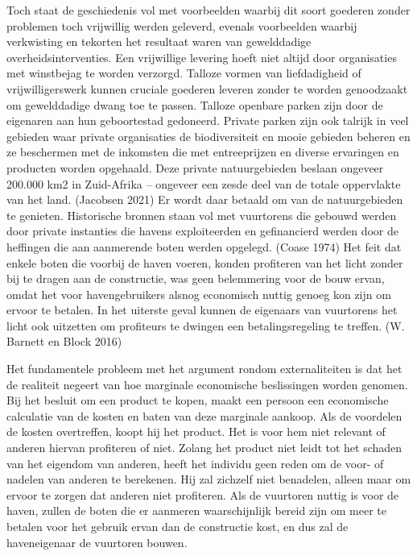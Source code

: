 \documentclass[
  a5paper,
  smalldemyvopaper,11pt,twoside,onecolumn,openright,extrafontsizes,
hidelinks]{memoir}
\begin{document}
Toch staat de geschiedenis vol met voorbeelden waarbij dit soort
goederen zonder problemen toch vrijwillig werden geleverd, evenals
voorbeelden waarbij verkwisting en tekorten het resultaat waren van
gewelddadige overheidsinterventies. Een vrijwillige levering hoeft niet
altijd door organisaties met winstbejag te worden verzorgd. Talloze
vormen van liefdadigheid of vrijwilligerswerk kunnen cruciale goederen
leveren zonder te worden genoodzaakt om gewelddadige dwang toe te
passen. Talloze openbare parken zijn door de eigenaren aan hun
geboortestad gedoneerd. Private parken zijn ook talrijk in veel gebieden
waar private organisaties de biodiversiteit en mooie gebieden beheren en
ze beschermen met de inkomsten die met entreeprijzen en diverse
ervaringen en producten worden opgehaald. Deze private natuurgebieden
beslaan ongeveer 200.000 km2 in Zuid-Afrika -- ongeveer een zesde deel
van de totale oppervlakte van het land. (Jacobsen 2021) Er wordt daar
betaald om van de natuurgebieden te genieten. Historische bronnen staan
vol met vuurtorens die gebouwd werden door private instanties die havens
exploiteerden en gefinancierd werden door de heffingen die aan
aanmerende boten werden opgelegd. (Coase 1974) Het feit dat enkele boten
die voorbij de haven voeren, konden profiteren van het licht zonder bij
te dragen aan de constructie, was geen belemmering voor de bouw ervan,
omdat het voor havengebruikers alsnog economisch nuttig genoeg kon zijn
om ervoor te betalen. In het uiterste geval kunnen de eigenaars van
vuurtorens het licht ook uitzetten om profiteurs te dwingen een
betalingsregeling te treffen. (W. Barnett en Block 2016)

Het fundamentele probleem met het argument rondom externaliteiten is dat
het de realiteit negeert van hoe marginale economische beslissingen
worden genomen. Bij het besluit om een product te kopen, maakt een
persoon een economische calculatie van de kosten en baten van deze
marginale aankoop. Als de voordelen de kosten overtreffen, koopt hij het
product. Het is voor hem niet relevant of anderen hiervan profiteren of
niet. Zolang het product niet leidt tot het schaden van het eigendom van
anderen, heeft het individu geen reden om de voor- of nadelen van
anderen te berekenen. Hij zal zichzelf niet benadelen, alleen maar om
ervoor te zorgen dat anderen niet profiteren. Als de vuurtoren nuttig is
voor de haven, zullen de boten die er aanmeren waarschijnlijk bereid
zijn om meer te betalen voor het gebruik ervan dan de constructie kost,
en dus zal de haveneigenaar de vuurtoren bouwen.
\end{document}
